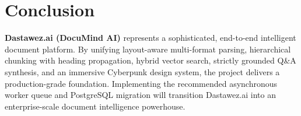 \documentclass[11pt,a4paper]{article}
\begin{document}
\section{Conclusion}
\textbf{Dastawez.ai (DocuMind AI)} represents a sophisticated, end-to-end intelligent document platform. By unifying layout-aware multi-format parsing, hierarchical chunking with heading propagation, hybrid vector search, strictly grounded Q\&A synthesis, and an immersive Cyberpunk design system, the project delivers a production-grade foundation. Implementing the recommended asynchronous worker queue and PostgreSQL migration will transition Dastawez.ai into an enterprise-scale document intelligence powerhouse.
\end{document}
